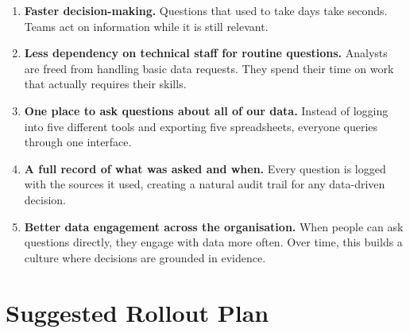 \documentclass[12pt, a4paper]{article}
\begin{document}
\begin{enumerate}[leftmargin=1.6em, itemsep=8pt]
  \item \textbf{Faster decision-making.}
  Questions that used to take days take seconds.
  Teams act on information while it is still relevant.

  \item \textbf{Less dependency on technical staff for routine questions.}
  Analysts are freed from handling basic data requests.
  They spend their time on work that actually requires their skills.

  \item \textbf{One place to ask questions about all of our data.}
  Instead of logging into five different tools and exporting five spreadsheets,
  everyone queries through one interface.

  \item \textbf{A full record of what was asked and when.}
  Every question is logged with the sources it used, creating a natural
  audit trail for any data-driven decision.

  \item \textbf{Better data engagement across the organisation.}
  When people can ask questions directly, they engage with data more often.
  Over time, this builds a culture where decisions are grounded in evidence.
\end{enumerate}


\section{Suggested Rollout Plan}
\end{document}
